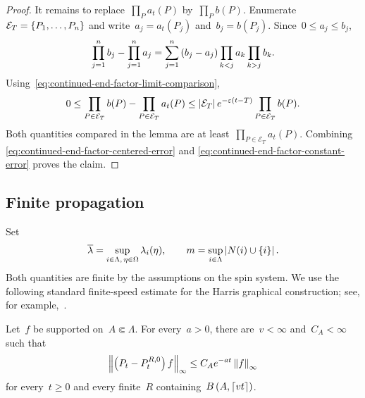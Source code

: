 \documentclass[EJP,preprint,NODS,nobera]{ejpecp}
\begin{document}
\begin{proof}
It remains to replace~$\prod_Pa_t(P)$ by~$\prod_Pb(P)$. Enumerate~$\mathcal E_T=\left\{P_1,\ldots,P_n\right\}$ and write~$a_j=a_t(P_j)$ and~$b_j=b(P_j)$. Since~$0\leq a_j\leq b_j$,
\begin{equation*}
\prod_{j=1}^n b_j-\prod_{j=1}^n a_j
=
\sum_{j=1}^n
\left(b_j-a_j\right)
\prod_{k<j}a_k
\prod_{k>j}b_k.
\end{equation*}
Using~\eqref{eq:continued-end-factor-limit-comparison},
\begin{equation}
\label{eq:continued-end-factor-constant-error}
0
\leq
\prod_{P\in\mathcal E_T}b(P)
-
\prod_{P\in\mathcal E_T}a_t(P)
\leq
\left|\mathcal E_T\right|e^{-\varepsilon(t-T)}
\prod_{P\in\mathcal E_T}b(P).
\end{equation}
Both quantities compared in the lemma are at least~$\prod_{P\in\mathcal E_T}a_t(P)$. Combining
\eqref{eq:continued-end-factor-centered-error} and
\eqref{eq:continued-end-factor-constant-error} proves the claim.
\end{proof}


\subsection{Finite propagation}
\label{app:finite-propagation}

Set
\begin{equation*}
\overline\lambda
=
\sup_{i\in\Lambda,\,\eta\in\Omega}\lambda_i(\eta),
\qquad
m
=
\sup_{i\in\Lambda}\left|N(i)\cup\left\{i\right\}\right|.
\end{equation*}
Both quantities are finite by the assumptions on the spin system. We use the
following standard finite-speed estimate for the Harris graphical
construction; see, for example,~\cite[Chapter~I]{Liggett1985}.

\begin{lemma}
\label{lem:finite-propagation}
Let~$f$ be supported on~$A\Subset\Lambda$. For every~$a>0$, there are~$v<\infty$ and~$C_A<\infty$ such that
\begin{equation}
\label{eq:finite-propagation}
\left\Vert\left(P_t-P_t^{R,0}\right)f\right\Vert_\infty
\leq
C_Ae^{-at}\left\Vert f\right\Vert_\infty
\end{equation}
for every~$t\geq0$ and every finite~$R$ containing~$B\left(A,\lceil vt\rceil\right)$.
\end{lemma}
\end{document}
